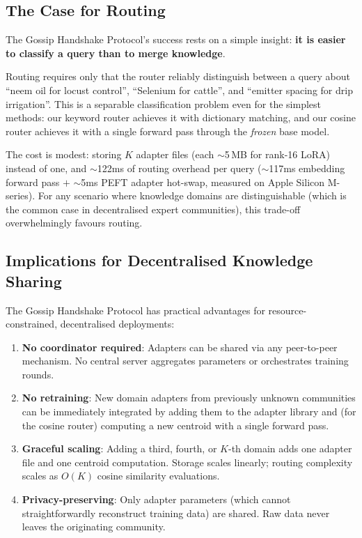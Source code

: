 \documentclass[conference, 10pt]{IEEEtran}
\begin{document}
\subsection{The Case for Routing}

The Gossip Handshake Protocol's success rests on a simple insight:
\textbf{it is easier to classify a query than to merge knowledge}.

Routing requires only that the router reliably distinguish between a
query about ``neem oil for locust control'', ``Selenium for cattle'',
and ``emitter spacing for drip irrigation''.
This is a separable classification problem even for the
simplest methods: our keyword router achieves it with dictionary
matching, and our cosine router achieves it with a single forward pass
through the \emph{frozen} base model.

The cost is modest: storing $K$ adapter files (each $\sim$5\,MB for
rank-16 LoRA) instead of one, and $\sim$122ms of routing overhead
per query ($\sim$117ms embedding forward pass $+$ $\sim$5ms PEFT
adapter hot-swap, measured on Apple Silicon M-series).
For any scenario where knowledge domains are
distinguishable (which is the common case in decentralised expert
communities), this trade-off overwhelmingly favours routing.

\subsection{Implications for Decentralised Knowledge Sharing}

The Gossip Handshake Protocol has practical advantages for
resource-constrained, decentralised deployments:

\begin{enumerate}
    \item \textbf{No coordinator required}: Adapters can be shared
          via any peer-to-peer mechanism. No central server aggregates
          parameters or orchestrates training rounds.
    \item \textbf{No retraining}: New domain adapters from previously
          unknown communities can be immediately integrated by adding
          them to the adapter library and (for the cosine router)
          computing a new centroid with a single forward pass.
    \item \textbf{Graceful scaling}: Adding a third, fourth, or
          $K$-th domain adds one adapter file and one centroid
          computation. Storage scales linearly; routing complexity
          scales as $O(K)$ cosine similarity evaluations.
    \item \textbf{Privacy-preserving}: Only adapter parameters
          (which cannot straightforwardly reconstruct training data)
          are shared. Raw data never leaves the originating community.
\end{enumerate}
\end{document}

